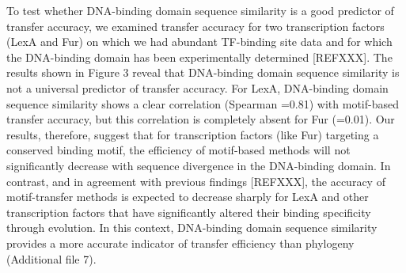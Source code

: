 To test whether DNA-binding domain sequence similarity is a good predictor of
transfer accuracy, we examined transfer accuracy for two transcription factors
(LexA and Fur) on which we had abundant TF-binding site data and for which the
DNA-binding domain has been experimentally determined [REFXXX]. The results
shown in Figure 3 reveal that DNA-binding domain sequence similarity is not a
universal predictor of transfer accuracy. For LexA, DNA-binding domain sequence
similarity shows a clear correlation (Spearman =0.81) with motif-based transfer
accuracy, but this correlation is completely absent for Fur (=0.01). Our
results, therefore, suggest that for transcription factors (like Fur) targeting
a conserved binding motif, the efficiency of motif-based methods will not
significantly decrease with sequence divergence in the DNA-binding domain. In
contrast, and in agreement with previous findings [REFXXX], the accuracy of
motif-transfer methods is expected to decrease sharply for LexA and other
transcription factors that have significantly altered their binding specificity
through evolution. In this context, DNA-binding domain sequence similarity
provides a more accurate indicator of transfer efficiency than phylogeny
(Additional file 7).

